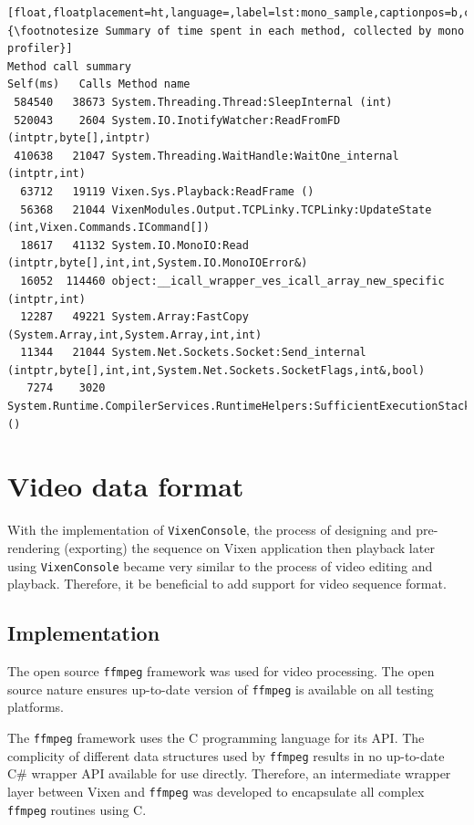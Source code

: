 \begin{lstlisting}[float,floatplacement=ht,language=,label=lst:mono_sample,captionpos=b,caption={\footnotesize Summary of time spent in each method, collected by mono profiler}]
Method call summary
Self(ms)   Calls Method name
 584540   38673 System.Threading.Thread:SleepInternal (int)
 520043    2604 System.IO.InotifyWatcher:ReadFromFD (intptr,byte[],intptr)
 410638   21047 System.Threading.WaitHandle:WaitOne_internal (intptr,int)
  63712   19119 Vixen.Sys.Playback:ReadFrame ()
  56368   21044 VixenModules.Output.TCPLinky.TCPLinky:UpdateState (int,Vixen.Commands.ICommand[])
  18617   41132 System.IO.MonoIO:Read (intptr,byte[],int,int,System.IO.MonoIOError&)
  16052  114460 object:__icall_wrapper_ves_icall_array_new_specific (intptr,int)
  12287   49221 System.Array:FastCopy (System.Array,int,System.Array,int,int)
  11344   21044 System.Net.Sockets.Socket:Send_internal (intptr,byte[],int,int,System.Net.Sockets.SocketFlags,int&,bool)
   7274    3020 System.Runtime.CompilerServices.RuntimeHelpers:SufficientExecutionStack ()
\end{lstlisting}

\section{Video data format}

With the implementation of \texttt{VixenConsole}, the process of designing and pre-rendering (exporting) the sequence on Vixen application then playback later using \texttt{VixenConsole} became very similar to the process of video editing and playback. Therefore, it  be beneficial to add support for video sequence format.

\subsection{Implementation}

The open source \texttt{ffmpeg} framework \cite{ffmpeg} was used for video processing. The open source nature ensures up-to-date version of \texttt{ffmpeg} is available on all testing platforms.

The \texttt{ffmpeg} framework uses the C programming language for its API. The complicity of different data structures used by \texttt{ffmpeg} results in no up-to-date C\# wrapper API available for use directly. Therefore, an intermediate wrapper layer between Vixen and \texttt{ffmpeg} was developed to encapsulate all complex \texttt{ffmpeg} routines using C.


